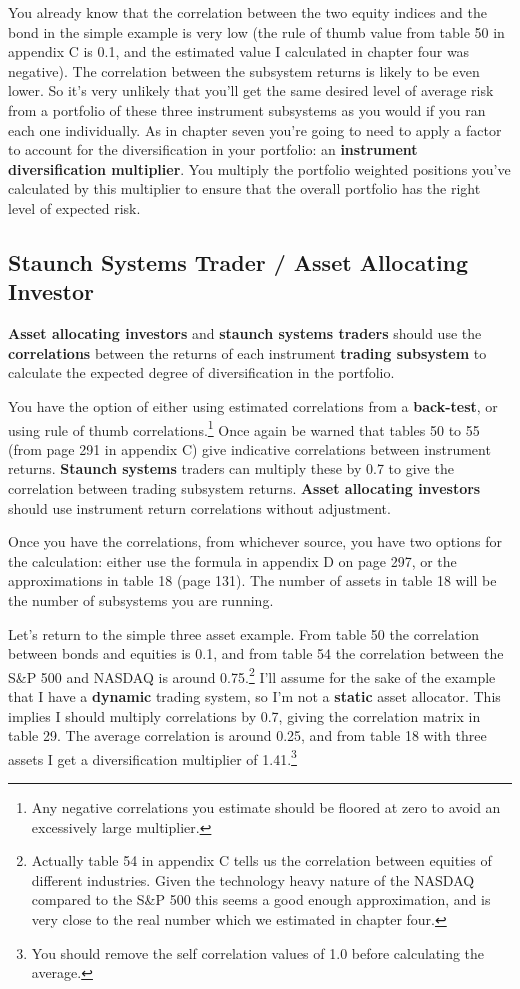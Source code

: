 You already know that the correlation between the two equity indices and the bond in the simple example is very low (the rule of thumb value from table 50 in appendix C is 0.1, and the estimated value I calculated in chapter four was negative). The correlation between the subsystem returns is likely to be even lower. So it's very unlikely that you'll get the same desired level of average risk from a portfolio of these three instrument subsystems as you would if you ran each one individually.
As in chapter seven you're going to need to apply a factor to account for the diversification in your portfolio: an \textbf{instrument diversification multiplier}. You multiply the portfolio weighted positions you've calculated by this multiplier to ensure that the overall portfolio has the right level of expected risk.

\subsection*{Staunch Systems Trader / Asset Allocating Investor}

\textbf{Asset allocating investors} and \textbf{staunch systems traders} should use the \textbf{correlations} between the returns of each instrument \textbf{trading subsystem} to calculate the expected degree of diversification in the portfolio.

You have the option of either using estimated correlations from a \textbf{back-test}, or using rule of thumb correlations.\footnote{Any negative correlations you estimate should be floored at zero to avoid an excessively large multiplier.} Once again be warned that tables 50 to 55 (from page 291 in appendix C) give indicative correlations between instrument returns. \textbf{Staunch systems} traders can multiply these by 0.7 to give the correlation between trading subsystem returns. \textbf{Asset allocating investors} should use instrument return correlations without adjustment.

Once you have the correlations, from whichever source, you have two options for the calculation: either use the formula in appendix D on page 297, or the approximations in table 18 (page 131). The number of assets in table 18 will be the number of subsystems you are running.

Let's return to the simple three asset example. From table 50 the correlation between bonds and equities is 0.1, and from table 54 the correlation between the S\&P 500 and NASDAQ is around 0.75.\footnote{Actually table 54 in appendix C tells us the correlation between equities of different industries. Given the technology heavy nature of the NASDAQ compared to the S\&P 500 this seems a good enough approximation, and is very close to the real number which we estimated in chapter four.} I'll assume for the sake of the example that I have a \textbf{dynamic} trading system, so I'm not a \textbf{static} asset allocator. This implies I should multiply correlations by 0.7, giving the correlation matrix in table 29. The average correlation is around 0.25, and from table 18 with three assets I get a diversification multiplier of 1.41.\footnote{You should remove the self correlation values of 1.0 before calculating the average.}

